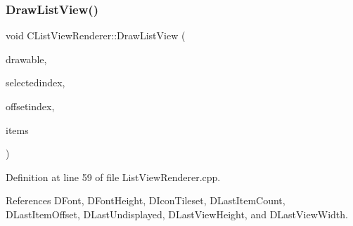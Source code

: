 \subsubsection{\texorpdfstring{Draw\+List\+View()}{DrawListView()}}
{\footnotesize\ttfamily void C\+List\+View\+Renderer\+::\+Draw\+List\+View (\begin{DoxyParamCaption}\item[{Gdk\+Drawable $\ast$}]{drawable,  }\item[{int}]{selectedindex,  }\item[{int}]{offsetindex,  }\item[{std\+::vector$<$ std\+::string $>$ \&}]{items }\end{DoxyParamCaption})}



Definition at line 59 of file List\+View\+Renderer.\+cpp.



References D\+Font, D\+Font\+Height, D\+Icon\+Tileset, D\+Last\+Item\+Count, D\+Last\+Item\+Offset, D\+Last\+Undisplayed, D\+Last\+View\+Height, and D\+Last\+View\+Width.


